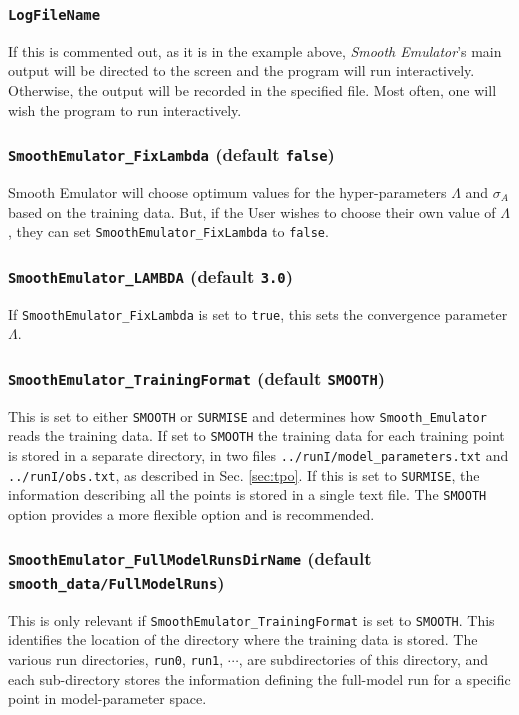 \documentclass[UserManual.tex]{subfiles}
\begin{document}
\subsubsection{{\tt LogFileName}}
If this is commented out, as it is in the example above, {\it Smooth Emulator}'s main output will be directed to the screen and the program will run interactively. Otherwise, the output will be recorded in the specified file. Most often, one will wish the program to run interactively.

\subsubsection{{\tt SmoothEmulator\_FixLambda} (default {\tt false})}
Smooth Emulator will choose optimum values for the hyper-parameters $\Lambda$ and $\sigma_A$ based on the training data. But, if the User wishes to choose their own value of $\Lambda$, they can set {\tt SmoothEmulator\_FixLambda} to {\tt false}.

\subsubsection{{\tt SmoothEmulator\_LAMBDA} (default {\tt 3.0})}
If {\tt SmoothEmulator\_FixLambda} is set to {\tt true}, this sets the convergence parameter $\Lambda$.

\subsubsection{{\tt SmoothEmulator\_TrainingFormat} (default {\tt SMOOTH})}
This is set to either {\tt SMOOTH} or {\tt SURMISE} and determines how {\tt Smooth\_Emulator} reads the training data. If set to {\tt SMOOTH} the training data for each training point is stored in a separate directory, in two files {\tt ../runI/model\_parameters.txt} and {\tt ../runI/obs.txt}, as described in Sec. \ref{sec:tpo}. If this is set to {\tt SURMISE}, the information describing all the points is stored in a single text file. The {\tt SMOOTH} option provides a more flexible option and is recommended. 

\subsubsection{{\tt SmoothEmulator\_FullModelRunsDirName} (default {\tt smooth\_data/FullModelRuns})}
This is only relevant if {\tt SmoothEmulator\_TrainingFormat} is set to {\tt SMOOTH}. This identifies the location of the directory where the training data is stored. The various run directories, {\tt run0}, {\tt run1}, $\cdots$, are subdirectories of this directory, and each sub-directory stores the information defining the full-model run for a specific point in model-parameter space.
\end{document}
